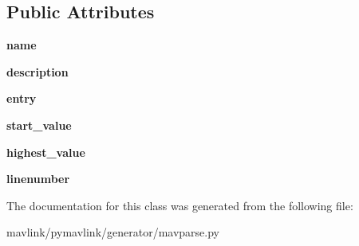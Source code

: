 \subsection*{Public Attributes}
\begin{DoxyCompactItemize}
\item 
\mbox{\label{classpymavlink_1_1generator_1_1mavparse_1_1MAVEnum_a2fddee7aa1c4e8898fb960602625d3b6}} 
{\bfseries name}
\item 
\mbox{\label{classpymavlink_1_1generator_1_1mavparse_1_1MAVEnum_a66ed34a84607dffbd68dca1f02eb78ae}} 
{\bfseries description}
\item 
\mbox{\label{classpymavlink_1_1generator_1_1mavparse_1_1MAVEnum_ad78eb30810557b736163590cc2f26499}} 
{\bfseries entry}
\item 
\mbox{\label{classpymavlink_1_1generator_1_1mavparse_1_1MAVEnum_aa1f35a0fc1111618288150eca229a106}} 
{\bfseries start\+\_\+value}
\item 
\mbox{\label{classpymavlink_1_1generator_1_1mavparse_1_1MAVEnum_a27010a521739ffcfc913d77c21c966f8}} 
{\bfseries highest\+\_\+value}
\item 
\mbox{\label{classpymavlink_1_1generator_1_1mavparse_1_1MAVEnum_a3a053a5e96cf7e8dd8c33fcb776983e7}} 
{\bfseries linenumber}
\end{DoxyCompactItemize}


The documentation for this class was generated from the following file\+:\begin{DoxyCompactItemize}
\item 
mavlink/pymavlink/generator/mavparse.\+py\end{DoxyCompactItemize}
